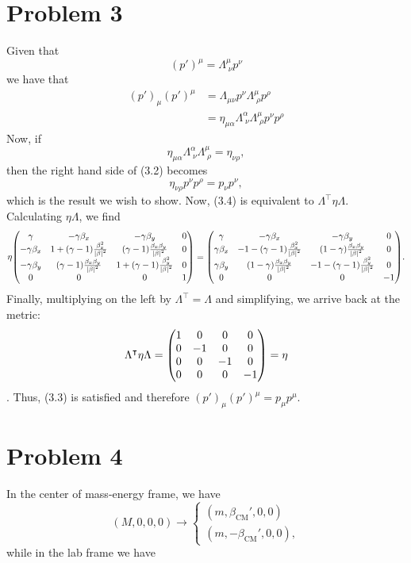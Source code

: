 \documentclass[12pt]{article}
\newcommand{\boostXY}{\mqty(\gamma & -\gamma\beta_x & -\gamma\beta_y & 0 \\ -\gamma\beta_x & 1 + (\gamma - 1)\frac{\beta_x^2}{\abs{\beta}^2} & (\gamma - 1)\frac{\beta_x\beta_y}{\abs{\beta}^2} & 0 \\ -\gamma\beta_y & (\gamma - 1)\frac{\beta_x\beta_y}{\abs{\beta}^2} & 1 + (\gamma - 1)\frac{\beta_y^2}{\abs{\beta}^2} & 0 \\ 0 & 0 & 0 & 1)}
\newcommand{\metric}{\mqty(1 & 0 & 0 & 0 \\ 0 & -1 & 0 & 0 \\ 0 & 0 & -1 & 0 \\ 0 & 0 & 0 & -1)}
\begin{document}
\section*{Problem 3}
Given that
\begin{equation*} \tag{3.1}
    (p')^\mu = \Lambda_{\;\nu}^\mu p^\nu 
\end{equation*}
we have that 
\begin{align*}
    (p')_\mu(p')^\mu &= \Lambda_{\mu\nu}p^\nu \Lambda_{\;\rho}^\mu p^\rho \\
    &= \eta_{\mu\alpha}\Lambda_{\;\nu}^\alpha\Lambda_{\;\rho}^\mu p^\nu p^\rho \tag{3.2}
\end{align*}
Now, if
\begin{equation*} \tag{3.3}
    \eta_{\mu\alpha}\Lambda_{\;\nu}^\alpha\Lambda_{\;\rho}^\mu = \eta_{\nu\rho},
\end{equation*}
then the right hand side of (3.2) becomes
\begin{equation*} \tag{3.4}
    \eta_{\nu\rho} p^\nu p^\rho = p_\nu p^\nu, 
\end{equation*}
which is the result we wish to show. Now, (3.4) is equivalent to $\Lambda^\intercal \eta \Lambda$. Calculating $\eta \Lambda$, we find
\begin{equation*}
    \eta \boostXY = \mqty(\gamma & -\gamma\beta_x & -\gamma\beta_y & 0 \\ \gamma\beta_x & -1 - (\gamma - 1)\frac{\beta_x^2}{\abs{\beta}^2} & (1 - \gamma)\frac{\beta_x\beta_y}{\abs{\beta}^2} & 0 \\ \gamma\beta_y & (1- \gamma)\frac{\beta_x\beta_y}{\abs{\beta}^2} & -1 - (\gamma - 1)\frac{\beta_y^2}{\abs{\beta}^2} & 0 \\ 0 & 0 & 0 & -1).
\end{equation*}
Finally, multiplying on the left by $\Lambda^\intercal = \Lambda$ and simplifying, we arrive back at the metric:
\[ \Lambda^\intercal \eta \Lambda = \metric = \eta \].
Thus, (3.3) is satisfied and therefore $(p')_\mu(p')^\mu = p_\mu p^\mu$.

\section*{Problem 4}
In the center of mass-energy frame, we have 
\begin{equation*} \tag{4.1}
    (M, 0, 0, 0) \rightarrow 
    \begin{cases*}
        (m, \beta_\text{CM}', 0, 0) \\
        (m, -\beta_\text{CM}', 0, 0),    
    \end{cases*}
\end{equation*}
while in the lab frame we have
\end{document}
